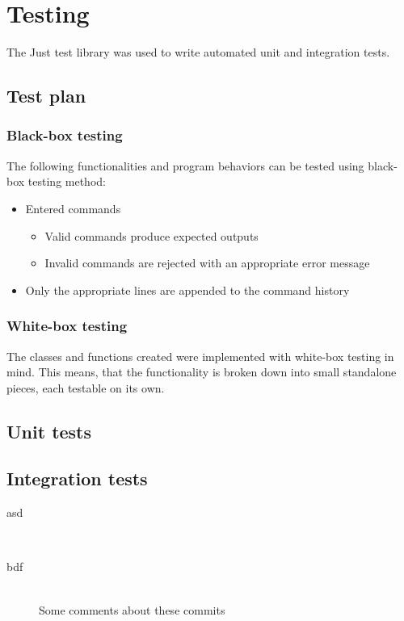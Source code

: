 
\chapter{Testing}

The Just\cite{just} test library was used to write automated unit and
integration tests.


\section{Test plan}

\subsection{Black-box testing}

The following functionalities and program behaviors can be tested using
black-box testing method:

\begin{itemize}
    \item Entered commands
    \begin{itemize}
        \item Valid commands produce expected outputs
        \item Invalid commands are rejected with an appropriate error message
    \end{itemize}
    \item Only the appropriate lines are appended to the command history
\end{itemize}

\subsection{White-box testing}

The classes and functions created were implemented with white-box testing in
mind. This means, that the functionality is broken down into small standalone
pieces, each testable on its own.


\section{Unit tests}


\section{Integration tests}


\begin{description}
    \item[asd] \hfill \\
    \item[bdf] \hfill \\
        Some comments about these commits
\end{description}

